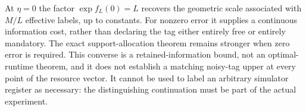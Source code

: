 At $\eta=0$ the factor $\exp f_L(0)=L$ recovers the geometric scale associated with $M/L$ effective labels, up to constants. For nonzero error it supplies a continuous information cost, rather than declaring the tag either entirely free or entirely mandatory. The exact support-allocation theorem remains stronger when zero error is required. This converse is a retained-information bound, not an optimal-runtime theorem, and it does not establish a matching noisy-tag upper at every point of the resource vector. It cannot be used to label an arbitrary simulator register as necessary: the distinguishing continuation must be part of the actual experiment.
